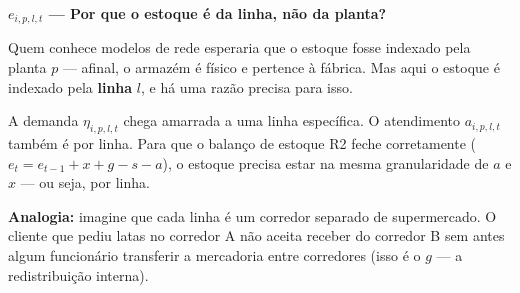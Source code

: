 \documentclass[12pt, a4paper]{article}
\begin{document}
\vspace{8pt}
\begin{mdframed}[style=destaque]
\textbf{\color{ballblue}$e_{i,p,l,t}$ --- Por que o estoque \'{e} da \textbf{linha}, n\~{a}o da planta?}

\medskip
Quem conhece modelos de rede esperaria que o estoque fosse indexado pela planta $p$
--- afinal, o armazém \'{e} f\'{i}sico e pertence \`{a} f\'{a}brica. Mas aqui o estoque
\'{e} indexado pela \textbf{linha} $l$, e h\'{a} uma raz\~{a}o precisa para isso.

\medskip
A demanda $\eta_{i,p,l,t}$ chega amarrada a uma linha espec\'{i}fica. O atendimento
$a_{i,p,l,t}$ tamb\'{e}m \'{e} por linha. Para que o balan\c{c}o de estoque R2 feche
corretamente ($e_{t} = e_{t-1} + x + g - s - a$), o estoque precisa estar
na mesma granularidade de $a$ e $x$ --- ou seja, por linha.

\medskip
\textbf{Analogia:} imagine que cada linha \'{e} um corredor separado de supermercado.
O cliente que pediu latas no corredor A n\~{a}o aceita receber do corredor B sem
antes algum funcion\'{a}rio transferir a mercadoria entre corredores
(isso \'{e} o $g$ --- a redistribui\c{c}\~{a}o interna).
\end{mdframed}
\end{document}
